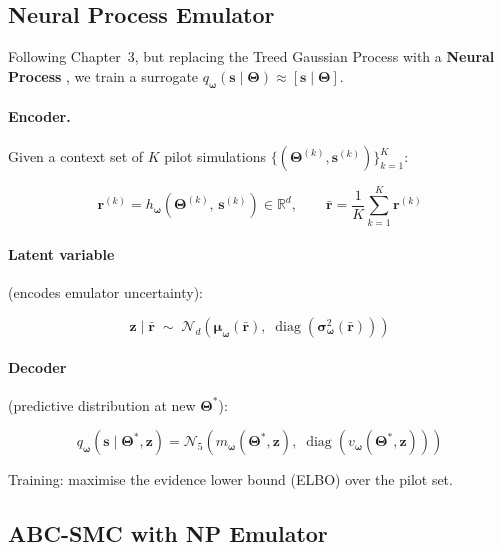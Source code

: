 \documentclass[12pt,a4paper]{article}
\theoremstyle{definition}
\newcommand{\diag}{\operatorname{diag}}
\newcommand{\N}{\mathcal{N}}
\newcommand{\bz}{\bm{z}}
\newcommand{\bs}{\bm{s}}
\newcommand{\br}{\bm{r}}
\newcommand{\bTheta}{\bm{\Theta}}
\newcommand{\bmu}{\bm{\mu}}
\newcommand{\bomega}{\bm{\omega}}
\begin{document}
\subsection{Neural Process Emulator}

Following \citet{heard2014} Chapter~3, but replacing the Treed Gaussian Process
with a \textbf{Neural Process} \citep{garnelo2018}, we train a surrogate
$q_{\bomega}(\bs \mid \bTheta) \approx [\bs\mid\bTheta]$.

\paragraph{Encoder.}  Given a context set of $K$ pilot simulations
$\{(\bTheta^{(k)}, \bs^{(k)})\}_{k=1}^{K}$:

\begin{equation}
  \br^{(k)} = h_{\bomega}\!\left(\bTheta^{(k)},\, \bs^{(k)}\right) \in \mathbb{R}^d,
  \qquad
  \bar{\br} = \frac{1}{K}\sum_{k=1}^{K} \br^{(k)}
  \label{eq:encoder}
\end{equation}

\paragraph{Latent variable} (encodes emulator uncertainty):

\begin{equation}
  \bz \mid \bar{\br}
  \;\sim\;
  \N_d\!\left(\bmu_{\bomega}(\bar{\br}),\;
    \diag\!\left(\bm{\sigma}^2_{\bomega}(\bar{\br})\right)\right)
  \label{eq:latent}
\end{equation}

\paragraph{Decoder} (predictive distribution at new $\bTheta^*$):

\begin{equation}
  q_{\bomega}\!\left(\bs \mid \bTheta^*, \bz\right)
  = \N_5\!\left(m_{\bomega}(\bTheta^*, \bz),\;
    \diag\!\left(v_{\bomega}(\bTheta^*, \bz)\right)\right)
  \label{eq:decoder}
\end{equation}

Training: maximise the evidence lower bound (ELBO) over the pilot set.

\subsection{ABC-SMC with NP Emulator}
\end{document}
